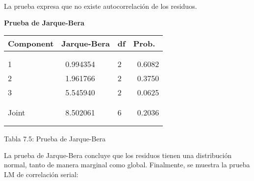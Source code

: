 La prueba expresa que no existe autocorrelaci\'{o}n de los residuos.

\textbf{Prueba de Jarque-Bera}

\begin{table}[H]
\begin{center}
\begin{tabular}{|p{64pt}|l|l|l|}
\hline
Component& 
Jarque-Bera& 
df& 
Prob. \\
\hline
& 
& 
& 
 \\
\hline
& 
& 
& 
 \\
\hline
1& 
~0.994354& 
2& 
~0.6082 \\
\hline
2& 
~1.961766& 
2& 
~0.3750 \\
\hline
3& 
~5.545940& 
2& 
~0.0625 \\
\hline
& 
& 
& 
 \\
\hline
& 
& 
& 
 \\
\hline
Joint& 
~8.502061& 
6& 
~0.2036 \\
\hline
& 
& 
& 
 \\
\hline
& 
& 
& 
 \\
\hline
\end{tabular}
\label{tab13}
\end{center}
\end{table}

\begin{center}
Tabla 7.5: Prueba de Jarque-Bera
\end{center}

La prueba de Jarque-Bera concluye que los residuos tienen una 
distribuci\'{o}n normal, tanto de manera marginal como global. Finalmente, 
se muestra la prueba LM de correlaci\'{o}n serial:

